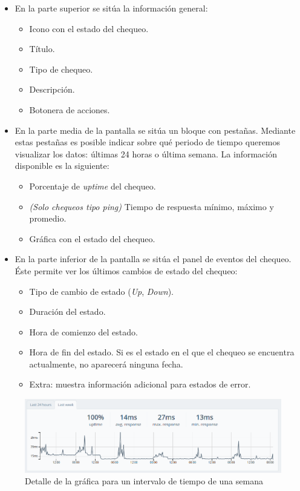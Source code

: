 \begin{itemize}
\item En la parte superior se sitúa la información general:
  \begin{itemize}
  \item Icono con el estado del chequeo.
  \item Título.
  \item Tipo de chequeo.
  \item Descripción.
  \item Botonera de acciones.
  \end{itemize}

\item En la parte media de la pantalla se sitúa un bloque con pestañas. Mediante
  estas pestañas es posible indicar sobre qué periodo de tiempo queremos
  visualizar los datos: últimas 24 horas o última semana. La información
  disponible es la siguiente:

  \begin{itemize}
  \item Porcentaje de \textit{uptime} del chequeo.
  \item \textit{(Solo chequeos tipo ping)} Tiempo de respuesta mínimo, máximo y promedio.
  \item Gráfica con el estado del chequeo.
  \end{itemize}

\item En la parte inferior de la pantalla se sitúa el panel de eventos del
  chequeo. Éste permite ver los últimos cambios de estado del chequeo:

  \begin{itemize}
  \item Tipo de cambio de estado (\textit{Up}, \textit{Down}).
  \item Duración del estado.
  \item Hora de comienzo del estado.
  \item Hora de fin del estado. Si es el estado en el que el chequeo se
    encuentra actualmente, no aparecerá ninguna fecha.
  \item Extra: muestra información adicional para estados de error.
  \end{itemize}
\end{itemize}

\begin{figure}[hbtp]
  \centering
  \includegraphics[width=\textwidth]{apendice_manual_usuario/pantalla_grafica_semanal.png}
  \caption{Detalle de la gráfica para un intervalo de tiempo de una semana}
  \label{fig:grafica-semanal}
\end{figure} 

